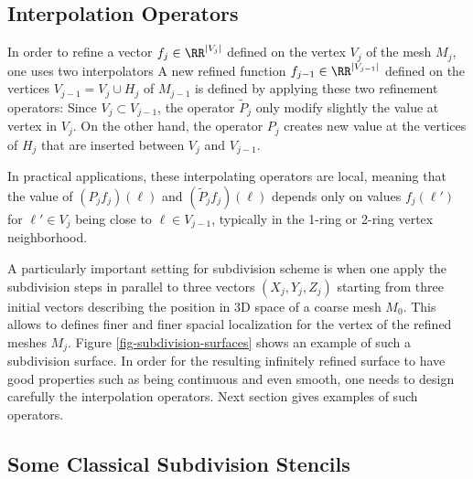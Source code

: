 \subsection{Interpolation Operators}

In order to refine a vector $f_{j} \in \RR^{|V_j|}$ defined on the vertex $V_j$ of the mesh $M_j$, one uses two interpolators 
A new refined function $f_{j-1} \in \RR^{|V_{j-1}|}$ defined on the vertices $V_{j-1}=V_j \cup H_j$ of $M_{j-1}$ is defined by applying these two refinement operators:
Since $V_j \subset V_{j-1}$, the operator $\tilde P_j$ only modify slightly the value at vertex in $V_j$. On the other hand, the operator $P_j$ creates new value at the vertices of $H_j$ that are inserted between $V_j$ and $V_{j-1}$.

In practical applications, these interpolating operators are local, meaning that the value of $(P_j f_j)(\ell)$ and $(\tilde P_j f_j)(\ell)$ depends only on values $f_j(\ell')$ for $\ell' \in V_j$ being close to $\ell \in V_{j-1}$, typically in the 1-ring or 2-ring vertex neighborhood. 

A particularly important setting for subdivision scheme is when one apply the subdivision steps in parallel to three vectors $(X_j,Y_j,Z_j)$ starting from three initial vectors describing the position in 3D space of a coarse mesh $M_0$. This allows to defines finer and finer spacial localization for the vertex of the refined meshes $M_j$. Figure \ref{fig-subdivision-surfaces} shows an example of such a subdivision surface. In order for the resulting infinitely refined surface to have good properties such as being continuous and even smooth, one needs to design carefully the interpolation operators. Next section gives examples of such operators. 



\subsection{Some Classical Subdivision Stencils}

